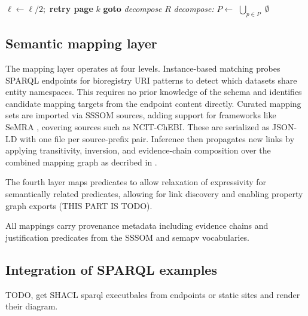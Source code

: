 \documentclass[12pt]{article}
\begin{document}
\begin{algorithm}[t]
\begin{algorithmic}[1]
    \Else
      \State $\ell \leftarrow \ell / 2$;\ \textbf{retry page} $k$
      \If{$\ell < \ell_{\min}$} \textbf{goto} \textit{decompose} \EndIf
    \EndIf
  \State \Return $R$
  \Statex
  \State \textit{decompose:}
   
    \State $P \leftarrow$ 
    \State \Return $\displaystyle\bigcup_{p \in P}$
  \EndIf
  \State \Return $\emptyset$ 
\EndFunction
\end{algorithmic}
\end{algorithm}

\subsection{Semantic mapping layer}

The mapping layer operates at four levels. Instance-based matching probes SPARQL endpoints
for bioregistry \cite{bioregistry} URI patterns to detect which datasets share entity
namespaces. This requires no prior knowledge of the schema and identifies candidate mapping
targets from the endpoint content directly. Curated mapping sets are imported via SSSOM sources,
adding support for frameworks like SeMRA \cite{hoyt_assembly_2025}, covering sources such as NCIT-ChEBI.
These are serialized as JSON-LD with one file per source-prefix pair. Inference then
propagates new links by applying transitivity, inversion, and evidence-chain composition
over the combined mapping graph as decribed in \cite{hoyt_assembly_2025}. 

The fourth layer maps predicates to allow relaxation of expressivity for semantically related 
predicates, allowing for link discovery and enabling property graph exports (THIS PART IS TODO).

All mappings carry provenance metadata including evidence chains and justification predicates 
from the SSSOM and semapv vocabularies.

\subsection{Integration of SPARQL examples}

TODO, get SHACL sparql executbales from endpoints or static sites and render their diagram.                                                                                   %
\end{document}
